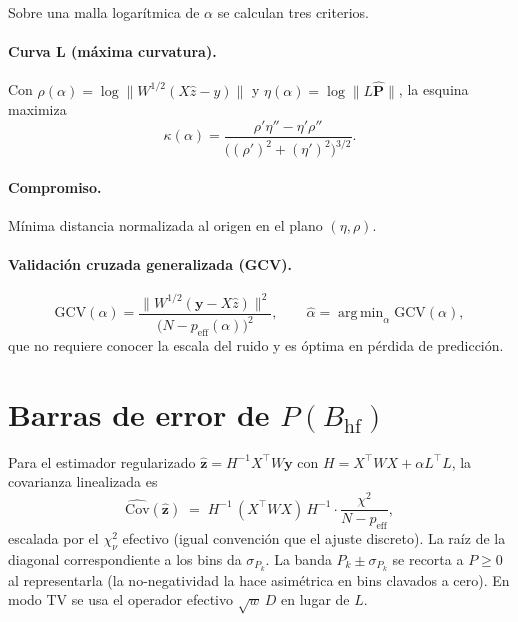 \documentclass[11pt,a4paper]{article}
\newcommand{\BHF}{B_{\mathrm{hf}}}
\DeclareMathOperator*{\argmin}{arg\,min}
\begin{document}
\medskip
Sobre una malla logarítmica de $\alpha$ se calculan tres criterios.

\paragraph{Curva L (máxima curvatura).} Con
$\rho(\alpha)=\log\lVert W^{1/2}(X\hat z-y)\rVert$ y
$\eta(\alpha)=\log\lVert L\hat{\bm P}\rVert$, la esquina maximiza
\begin{equation}
  \kappa(\alpha)=\frac{\rho'\eta''-\eta'\rho''}{\bigl((\rho')^2+(\eta')^2\bigr)^{3/2}}.
\end{equation}

\paragraph{Compromiso.} Mínima distancia normalizada al origen en el plano
$(\eta,\rho)$.

\paragraph{Validación cruzada generalizada (GCV).}
\begin{equation}
  \mathrm{GCV}(\alpha)=\frac{\lVert W^{1/2}(\bm y - X\hat z)\rVert^2}{\bigl(N-p_{\text{eff}}(\alpha)\bigr)^2},
  \qquad \hat\alpha=\argmin_\alpha \mathrm{GCV}(\alpha),
\end{equation}
que no requiere conocer la escala del ruido y es óptima en pérdida de predicción.

\section{Barras de error de \texorpdfstring{$P(\BHF)$}{P(BHF)}}\label{sec:perr}

Para el estimador regularizado $\hat{\bm z}=H^{-1}X^\top W\bm y$ con
$H=X^\top WX+\alpha L^\top L$, la covarianza linealizada es
\begin{equation}
  \widehat{\mathrm{Cov}}(\hat{\bm z}) \;=\; H^{-1}\,(X^\top WX)\,H^{-1}\cdot\frac{\chi^2}{N-p_{\text{eff}}},
\end{equation}
escalada por el $\chi^2_\nu$ efectivo (igual convención que el ajuste discreto). La
raíz de la diagonal correspondiente a los bins da $\sigma_{P_k}$. La banda
$P_k\pm\sigma_{P_k}$ se recorta a $P\ge0$ al representarla (la no-negatividad la
hace asimétrica en bins clavados a cero). En modo TV se usa el operador efectivo
$\sqrt{w}\,D$ en lugar de $L$.
\end{document}
